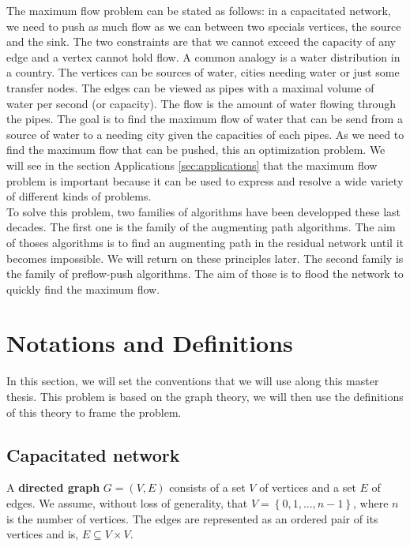 The maximum flow problem can be stated as follows: in a capacitated network, we need to push as much flow as we can between two specials vertices, the source and the sink. The two constraints are that we cannot exceed the capacity of any edge and a vertex cannot hold flow. A common analogy is a water distribution in a country. The vertices can be sources of water, cities needing water or just some transfer nodes. The edges can be viewed as pipes with a maximal volume of water per second (or capacity). The flow is the amount of water flowing through the pipes. The goal is to find the maximum flow of water that can be send from a source of water to a needing city given the capacities of each pipes. As we need to find the maximum flow that can be pushed, this an optimization problem. We will see in the section Applications \ref{sec:applications} that the maximum flow problem is important because it can be used to express and resolve a wide variety of different kinds of problems.\\

To solve this problem, two families of algorithms have been developped these last decades. The first one is the family of the augmenting path algorithms. The aim of thoses algorithms is to find an augmenting path in the residual network until it becomes impossible. We will return on these principles later. The second family is the family of preflow-push algorithms. The aim of those is to flood the network to quickly find the maximum flow. \\


\section{Notations and Definitions}

In this section, we will set the conventions that we will use along this master thesis. This problem is based on the graph theory, we will then use the definitions of this theory to frame the problem.

\subsection{Capacitated network}
\begin{definition}
\label{dgraph}
A \textbf{directed graph} $G = (V, E)$ consists of a set $V$ of vertices and a set $E$ of edges. We assume, without loss of generality, that $V = \left\{0, 1, ..., n-1\right\}$, where $n$ is the number of vertices. The edges are represented as an ordered pair of its vertices and is, $E \subseteq V \times V$.
\end{definition}

